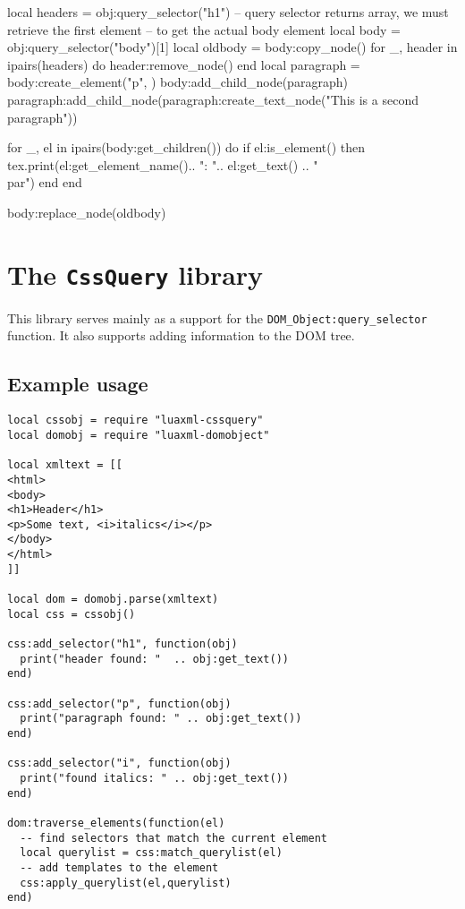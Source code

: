 \documentclass{ltxdoc}
\begin{document}
\begin{framed}
  \begin{luacode*}
local headers = obj:query_selector("h1")
-- query selector returns array, we must retrieve the first element
-- to get the actual body element
local body = obj:query_selector("body")[1]
local oldbody = body:copy_node()
for _, header in ipairs(headers) do
  header:remove_node()
end
local paragraph = body:create_element("p", {})
body:add_child_node(paragraph)
paragraph:add_child_node(paragraph:create_text_node("This is a second paragraph"))

for _, el in ipairs(body:get_children()) do
if el:is_element() then
  tex.print(el:get_element_name().. ": ".. el:get_text() .. "\\par")
end
end

body:replace_node(oldbody)
  \end{luacode*}
\end{framed}


\section{The \texttt{CssQuery} library}

This library serves mainly as a support for the
\texttt{DOM\_Object:query\_selector} function. It also supports adding
information to the DOM tree.

\subsection{Example usage}

\begin{verbatim}
local cssobj = require "luaxml-cssquery"
local domobj = require "luaxml-domobject"

local xmltext = [[
<html>
<body>
<h1>Header</h1>
<p>Some text, <i>italics</i></p>
</body>
</html>
]]

local dom = domobj.parse(xmltext)
local css = cssobj()

css:add_selector("h1", function(obj)
  print("header found: "  .. obj:get_text())
end)

css:add_selector("p", function(obj)
  print("paragraph found: " .. obj:get_text())
end)

css:add_selector("i", function(obj)
  print("found italics: " .. obj:get_text())
end)

dom:traverse_elements(function(el)
  -- find selectors that match the current element
  local querylist = css:match_querylist(el)
  -- add templates to the element
  css:apply_querylist(el,querylist)
end)
\end{verbatim}
\end{document}
